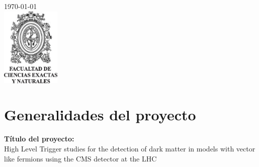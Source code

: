 \begin{titlepage}


{\large \today}\\[0.7cm] %


\includegraphics[width=2.8cm]{udea_fcen.jpg}\\[4cm] %
 

\vfill %

\end{titlepage}

\tableofcontents %

\cleardoublepage





\section{Generalidades del proyecto}

\textbf{Título del proyecto:}\\
High Level Trigger studies for the detection of dark matter in models with vector like fermions using the CMS detector at the LHC
\\


